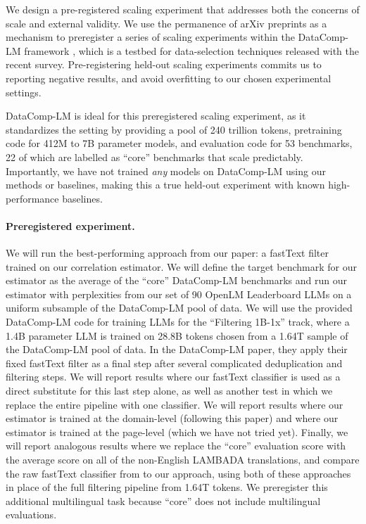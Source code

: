 \documentclass{article} %
\begin{document}
We design a pre-registered scaling experiment that addresses both the concerns of scale and external validity. We use the permanence of arXiv preprints as a mechanism to preregister a series of scaling experiments within the DataComp-LM framework \citep{datacomp}, which is a testbed for data-selection techniques released with the recent survey. Pre-registering held-out scaling experiments commits us to reporting negative results, and avoid overfitting to our chosen experimental settings.

DataComp-LM is ideal for this preregistered scaling experiment, as it standardizes the setting by providing a pool of 240 trillion tokens, pretraining code for 412M to 7B parameter models, and evaluation code for 53 benchmarks, 22 of which are labelled as ``core'' benchmarks that scale predictably. Importantly, we have not trained \emph{any} models on DataComp-LM using our methods or baselines, making this a true held-out experiment with known high-performance baselines.

\paragraph*{Preregistered experiment.}
We will run the best-performing approach from our paper: a fastText filter trained on our correlation estimator. We will define the target benchmark for our estimator as the average of the ``core'' DataComp-LM benchmarks and run our estimator with perplexities from our set of 90 OpenLM Leaderboard LLMs on a uniform subsample of the DataComp-LM pool of data. We will use the provided DataComp-LM code for training LLMs for the ``Filtering 1B-1x'' track, where a 1.4B parameter LLM is trained on 28.8B tokens chosen from a 1.64T sample of the DataComp-LM pool of data. In the DataComp-LM paper, they apply their fixed fastText filter as a final step after several complicated deduplication and filtering steps. We will report results where our fastText classifier is used as a direct substitute for this last step alone, as well as another test in which we replace the entire pipeline with one classifier. We will report results where our estimator is trained at the domain-level (following this paper) and where our estimator is trained at the page-level (which we have not tried yet). Finally, we will report analogous results where we replace the ``core'' evaluation score with the average score on all of the non-English LAMBADA translations, and compare the raw fastText classifier from \citet{datacomp} to our approach, using both of these approaches in place of the full filtering pipeline from 1.64T tokens. We preregister this additional multilingual task because ``core'' does not include multilingual evaluations.
\end{document}
